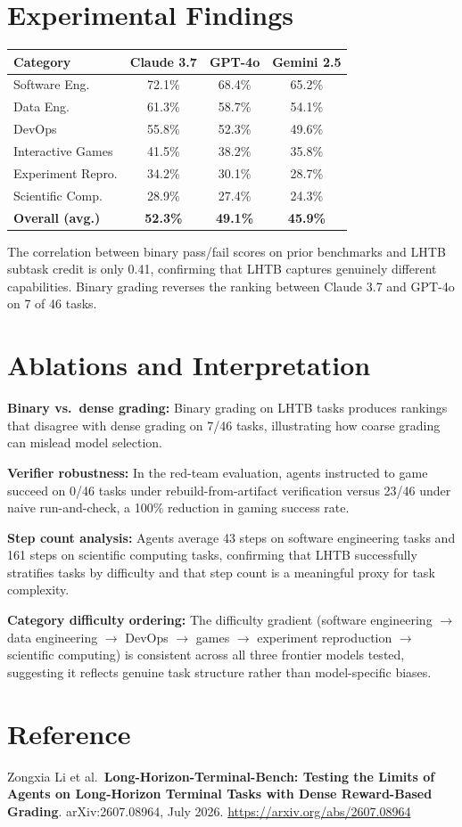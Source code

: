 \documentclass[10pt,twocolumn]{article}
\begin{document}
\section{Experimental Findings}

\begin{center}
\small
\begin{tabular}{lccc}
\toprule
Category & Claude 3.7 & GPT-4o & Gemini 2.5 \\
\midrule
Software Eng. & 72.1\% & 68.4\% & 65.2\% \\
Data Eng. & 61.3\% & 58.7\% & 54.1\% \\
DevOps & 55.8\% & 52.3\% & 49.6\% \\
Interactive Games & 41.5\% & 38.2\% & 35.8\% \\
Experiment Repro. & 34.2\% & 30.1\% & 28.7\% \\
Scientific Comp. & 28.9\% & 27.4\% & 24.3\% \\
\midrule
\textbf{Overall (avg.)} & \textbf{52.3\%} & \textbf{49.1\%} & \textbf{45.9\%} \\
\bottomrule
\end{tabular}
\end{center}

The correlation between binary pass/fail scores on prior benchmarks
and LHTB subtask credit is only 0.41, confirming that LHTB captures
genuinely different capabilities. Binary grading reverses the ranking
between Claude 3.7 and GPT-4o on 7 of 46 tasks.

\section{Ablations and Interpretation}

\textbf{Binary vs.\ dense grading:} Binary grading on LHTB tasks
produces rankings that disagree with dense grading on 7/46 tasks,
illustrating how coarse grading can mislead model selection.

\textbf{Verifier robustness:} In the red-team evaluation, agents
instructed to game succeed on 0/46 tasks under rebuild-from-artifact
verification versus 23/46 under naive run-and-check, a 100\%
reduction in gaming success rate.

\textbf{Step count analysis:} Agents average 43 steps on software
engineering tasks and 161 steps on scientific computing tasks,
confirming that LHTB successfully stratifies tasks by difficulty and
that step count is a meaningful proxy for task complexity.

\textbf{Category difficulty ordering:} The difficulty gradient
(software engineering $\to$ data engineering $\to$ DevOps $\to$
games $\to$ experiment reproduction $\to$ scientific computing)
is consistent across all three frontier models tested, suggesting
it reflects genuine task structure rather than model-specific biases.

\section*{Reference}

Zongxia Li et al.\
\textbf{Long-Horizon-Terminal-Bench: Testing the Limits of Agents on
Long-Horizon Terminal Tasks with Dense Reward-Based Grading}.
arXiv:2607.08964, July 2026.
\url{https://arxiv.org/abs/2607.08964}
\end{document}

